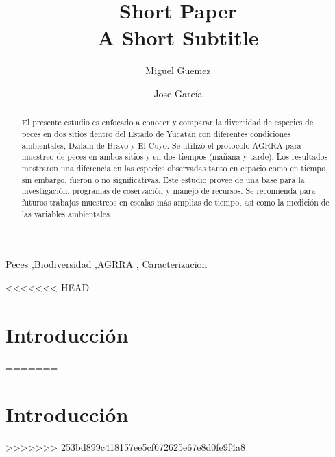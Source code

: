 \documentclass[
  authoryear,
  preprint,
  3p]{elsarticle}
\begin{document}
\begin{frontmatter}
\title{Short Paper \\\large{A Short Subtitle} }
\author[1]{Miguel Guemez%
%
}
\author[1]{Jose García%
%
}




        
\begin{abstract}
El presente estudio es enfocado a conocer y comparar la diversidad de
especies de peces en dos sitios dentro del Estado de Yucatán con
diferentes condiciones ambientales, Dzilam de Bravo y El Cuyo. Se
utilizó el protocolo AGRRA para muestreo de peces en ambos sitios y en
dos tiempos (mañana y tarde). Los resultados mostraron una diferencia en
las especies observadas tanto en espacio como en tiempo, sin embargo,
fueron o no significativas. Este estudio provee de una base para la
investigación, programas de coservación y manejo de recursos. Se
recomienda para futuros trabajos muestreos en escalas más amplias de
tiempo, así como la medición de las variables ambientales.
\end{abstract}





\begin{keyword}
    Peces \sep Biodiversidad \sep AGRRA \sep 
    Caracterizacion
\end{keyword}
\end{frontmatter}
<<<<<<< HEAD
    
\section{Introducción}\label{introducciuxf3n}
=======
    \ifdefined\Shaded\renewenvironment{Shaded}{\begin{tcolorbox}[borderline west={3pt}{0pt}{shadecolor}, frame hidden, interior hidden, sharp corners, enhanced, breakable, boxrule=0pt]}{\end{tcolorbox}}\fi

\hypertarget{introducciuxf3n}{%
\section{Introducción}\label{introducciuxf3n}}
>>>>>>> 253bd899c418157ee5cf672625e67e8d0fe9f4a8
\end{document}
